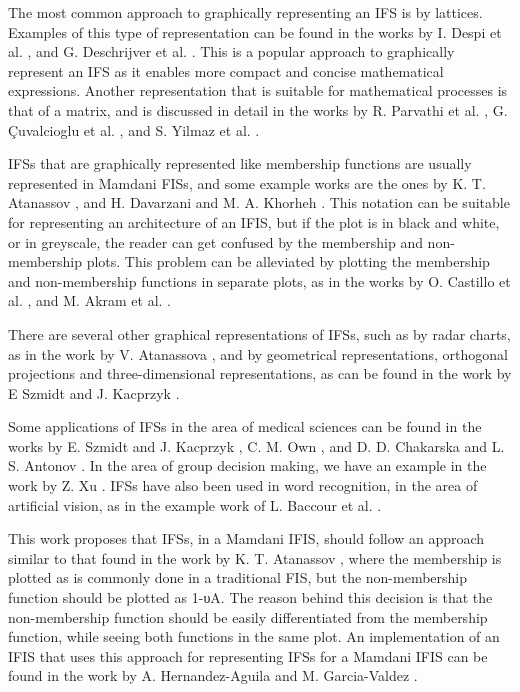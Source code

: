 
The most common approach to graphically representing an IFS is by
lattices. Examples of this type of representation can be found in the works by
I. Despi et al. \cite{Despi2013}, and G. Deschrijver et
al. \cite{Deschrijver2004}. This is a popular approach to graphically represent
an IFS as it enables more compact and concise mathematical expressions. Another
representation that is suitable for mathematical processes is that of a matrix,
and is discussed in detail in the works by R. Parvathi et
al. \cite{Parvathi2014}, G. Çuvalcioglu et al. \cite{Yilmaz2015}, and S. Yilmaz
et al. \cite{Yilmaz2015a}.

IFSs that are graphically represented like membership functions are usually
represented in Mamdani FISs, and some example works are the ones by
K. T. Atanassov \cite{Atanassov1986}, and H. Davarzani and M. A. Khorheh
\cite{Davarzani2013}. This notation can be suitable for representing an
architecture of an IFIS, but if the plot is in black and white, or in greyscale,
the reader can get confused by the membership and non-membership plots. This
problem can be alleviated by plotting the membership and non-membership
functions in separate plots, as in the works by O. Castillo et
al. \cite{castillo2007intuitionistic}, and M. Akram et al. \cite{Akram2014}.

There are several other graphical representations of IFSs, such as by radar
charts, as in the work by V. Atanassova \cite{Atanassova2010}, and by
geometrical representations, orthogonal projections and three-dimensional
representations, as can be found in the work by E Szmidt and J. Kacprzyk
\cite{Szmidt2000}.

Some applications of IFSs in the area of medical sciences can be found in the
works by E. Szmidt and J. Kacprzyk \cite{Szmidt2001}, C. M. Own \cite{Own2009},
and D. D. Chakarska and L. S. Antonov \cite{Antonov1995}. In the area of group
decision making, we have an example in the work by Z. Xu \cite{Xu2007}. IFSs
have also been used in word recognition, in the area of artificial vision, as in
the example work of L. Baccour et al. \cite{Baccour2008}.

This work proposes that IFSs, in a Mamdani IFIS, should follow an approach
similar to that found in the work by K. T. Atanassov \cite{Atanassov2003}, where
the membership is plotted as is commonly done in a traditional FIS, but the
non-membership function should be plotted as 1-υA. The reason behind this
decision is that the non-membership function should be easily differentiated
from the membership function, while seeing both functions in the same plot. An
implementation of an IFIS that uses this approach for representing IFSs for a
Mamdani IFIS can be found in the work by A. Hernandez-Aguila and
M. Garcia-Valdez \cite{Hernandez-aguila}.

